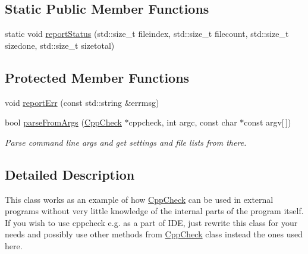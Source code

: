 \subsection*{Static Public Member Functions}
\begin{DoxyCompactItemize}
\item 
static void \hyperlink{class_cpp_check_executor_adc4f6c580cab5a1966a0be29cade9b59}{report\-Status} (std\-::size\-\_\-t fileindex, std\-::size\-\_\-t filecount, std\-::size\-\_\-t sizedone, std\-::size\-\_\-t sizetotal)
\end{DoxyCompactItemize}
\subsection*{Protected Member Functions}
\begin{DoxyCompactItemize}
\item 
void \hyperlink{class_cpp_check_executor_ab0a085ded28a9fb0aed92f6504b2f8f3}{report\-Err} (const std\-::string \&errmsg)
\item 
bool \hyperlink{class_cpp_check_executor_a2e49a707d437ebaa0ff2166248803c7b}{parse\-From\-Args} (\hyperlink{class_cpp_check}{Cpp\-Check} $\ast$cppcheck, int argc, const char $\ast$const argv\mbox{[}$\,$\mbox{]})
\begin{DoxyCompactList}\small\item\em Parse command line args and get settings and file lists from there. \end{DoxyCompactList}\end{DoxyCompactItemize}


\subsection{Detailed Description}
This class works as an example of how \hyperlink{class_cpp_check}{Cpp\-Check} can be used in external programs without very little knowledge of the internal parts of the program itself. If you wish to use cppcheck e.\-g. as a part of I\-D\-E, just rewrite this class for your needs and possibly use other methods from \hyperlink{class_cpp_check}{Cpp\-Check} class instead the ones used here. 

